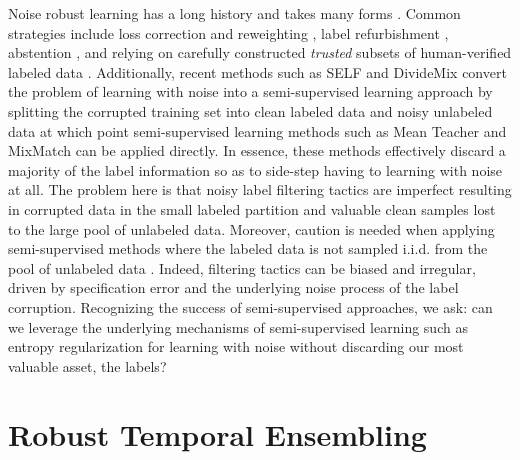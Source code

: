 \documentclass{article}
\begin{document}
Noise robust learning has a long history and takes many forms \cite{NIPS2013_5073,6685834,2020arXiv200708199S}.  Common strategies include loss correction and reweighting \cite{patrini2016,zhang2018,Menon2020Can}, label refurbishment \cite{reed2014,song2019}, abstention \cite{thulasidasan2019}, and relying on carefully constructed \emph{trusted} subsets of human-verified labeled data \cite{liiccv2017,NIPS2018_8246,zhang2020}.  Additionally, recent methods such as SELF \cite{nguyen2020} and DivideMix \cite{li2020} convert the problem of learning with noise into a semi-supervised learning approach by splitting the corrupted training set into clean labeled data and noisy unlabeled data at which point semi-supervised learning methods such as Mean Teacher \cite{tarvainen2017} and MixMatch \cite{48557} can be applied directly.  In essence, these methods effectively discard a majority of the label information so as to side-step having to learning with noise at all.  The problem here is that noisy label filtering tactics are imperfect resulting in corrupted data in the small labeled partition and valuable clean samples lost to the large pool of unlabeled data.  Moreover, caution is needed when applying semi-supervised methods where the labeled data is not sampled i.i.d. from the pool of unlabeled data \cite{NEURIPS2018_c1fea270}.  Indeed, filtering tactics can be biased and irregular, driven by specification error and the underlying noise process of the label corruption.  Recognizing the success of semi-supervised approaches, we ask: can we leverage the underlying mechanisms of semi-supervised learning such as entropy regularization for learning with noise without discarding our most valuable asset, the labels? 



\section{Robust Temporal Ensembling}
\end{document}
